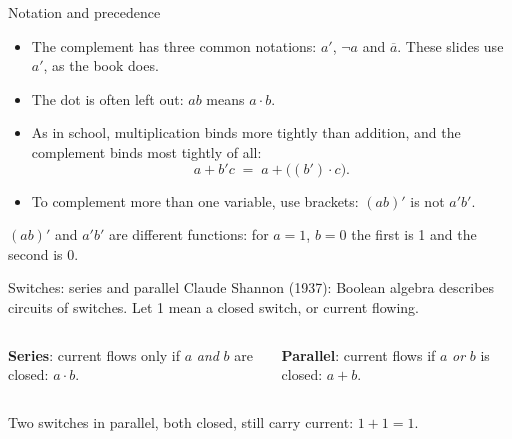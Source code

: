 \documentclass[10pt]{wosm-slides}
\newcommand*\switch[2]{%
  \fill[wosm-text] (#1) circle (1.6pt) ++(0.9,0) circle (1.6pt);
  \draw[wosm-text, line width=0.8pt] (#1) -- ++(0.8,0.38);
  \node[edgelabel, above] at ($(#1)+(0.45,0.3)$) {$#2$};}
\begin{document}
\begin{frame}{Notation and precedence}
  \begin{itemize}
    \item The complement has three common notations: $a'$, $\lnot a$ and
      $\overline{a}$. These slides use $a'$, as the book does.
    \item The dot is often left out: $ab$ means $a \cdot b$.
    \item As in school, multiplication binds more tightly than addition, and the
      complement binds most tightly of all:
      \[ a + b'c \;=\; a + \bigl((b') \cdot c\bigr). \]
    \item To complement more than one variable, use brackets: $(ab)'$ is not
      $a'b'$.
  \end{itemize}

  \begin{warning}
    $(ab)'$ and $a'b'$ are different functions: for $a = 1$, $b = 0$ the first is 1
    and the second is 0.
  \end{warning}
\end{frame}

\begin{frame}{Switches: series and parallel}
  Claude Shannon (1937): Boolean algebra describes circuits of switches. Let 1 mean
  a closed switch, or current flowing.

  \medskip
  \begin{columns}[b, totalwidth=\textwidth]
      \centering
      \par\medskip
      \textbf{Series}: current flows only if $a$ \emph{and} $b$ are closed:
      $a \cdot b$.
      \centering
      \par\medskip
      \textbf{Parallel}: current flows if $a$ \emph{or} $b$ is closed: $a + b$.
  \end{columns}

  \bigskip
  Two switches in parallel, both closed, still carry current: $1 + 1 = 1$.
\end{frame}
\end{document}
